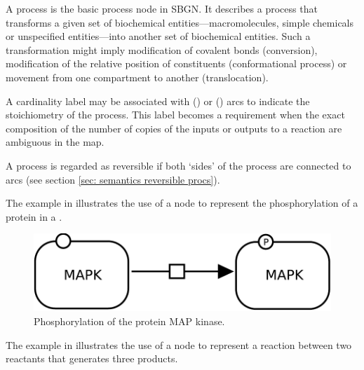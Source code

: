 A process is the basic process node in SBGN.  It describes a process that transforms a given set of biochemical entities---macromolecules, simple chemicals or unspecified entities---into another set of biochemical entities.  Such a transformation might imply modification of covalent bonds (conversion), modification of the relative position of constituents (conformational process) or movement from one compartment to another (translocation).

A cardinality label may be associated with  () or  () arcs to indicate the stoichiometry of the process.  This label becomes a requirement when the exact composition of the number of copies of the inputs or outputs to a reaction are ambiguous in the map.

A process is regarded as reversible if both `sides' of the process are connected to  arcs (see section \ref{sec: semantics reversible procs}).

The example in  illustrates the use of a  node to represent the phosphorylation of a protein in a \PD.

\begin{figure}[H]
  \centering
  \includegraphics[scale = 0.3]{examples/process-phosphorylation}
  \caption{Phosphorylation of the protein MAP kinase.}
  \label{fig:trans-phos}
\end{figure}

The example in  illustrates the use of a  node to represent a reaction between two reactants that generates three products. 

